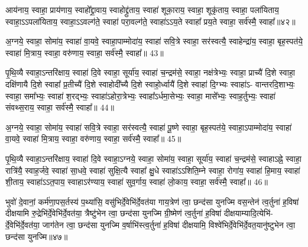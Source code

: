 {\anuvakamend[{रन्तिः॒ स्वाहा॒ द्वाविꣳ॑शतिश्च॥12॥}]}

आय॑नाय॒ स्वाहा॒ प्राय॑णाय॒ स्वाहो᳚द्द्रा॒वाय॒ स्वाहोद्द्रु॑ताय॒ स्वाहा॑ शूका॒राय॒ स्वाहा॒ शूकृ॑ताय॒ स्वाहा॒ पला॑यिताय॒ स्वाहा॒\-ऽ\-ऽपला॑यिताय॒ स्वाहा॒\-ऽ\-ऽवल्ग॑ते॒ स्वाहा॑ परा॒वल्ग॑ते॒ स्वाहा॑\-ऽ\-ऽय॒ते स्वाहा᳚ प्रय॒ते स्वाहा॒ सर्व॑स्मै॒ स्वाहा᳚॥४२॥

{\anuvakamend[{आय॑ना॒योत्त॑रमा॒पला॑यिताय॒ षड्विꣳ॑शतिः॥13॥}]}

अ॒ग्नये॒ स्वाहा॒ सोमा॑य॒ स्वाहा॑ वा॒यवे॒ स्वाहा॒पाम्मोदा॑य॒ स्वाहा॑ सवि॒त्रे स्वाहा॒ सर॑स्वत्यै॒ स्वाहेन्द्रा॑य॒ स्वाहा॒ बृह॒स्पत॑ये॒ स्वाहा॑ मि॒त्राय॒ स्वाहा॒ वरु॑णाय॒ स्वाहा॒ सर्व॑स्मै॒ स्वाहा᳚॥ 43॥

{\anuvakamend[{}]}

पृ॒थि॒व्यै स्वाहा॒\-ऽन्तरि॑क्षाय॒ स्वाहा॑ दि॒वे स्वाहा॒ सूर्या॑य॒ स्वाहा॑ च॒न्द्रम॑से॒ स्वाहा॒ नक्ष॑त्रेभ्यः॒ स्वाहा॒ प्राच्यै॑ दि॒शे स्वाहा॒ दक्षि॑णायै दि॒शे स्वाहा᳚ प्र॒तीच्यै॑ दि॒शे स्वाहोदी᳚च्यै दि॒शे स्वाहो॒र्ध्वायै॑ दि॒शे स्वाहा॑ दि॒ग्भ्यः स्वाहा॑\-ऽ- वान्तरदि॒शाभ्यः॒ स्वाहा॒ समा᳚भ्यः॒ स्वाहा॑ श॒रद्भ्यः॒ स्वाहा॑\-ऽहोरा॒त्रेभ्यः॒ स्वाहा᳚\-ऽर्धमा॒सेभ्यः॒ स्वाहा॒ मासे᳚भ्यः॒ स्वाह॒र्तुभ्यः॒ स्वाहा॑ संवथ्स॒राय॒ स्वाहा॒ सर्व॑स्मै॒ स्वाहा᳚॥ 44॥

{\anuvakamend[{}]}

अ॒ग्नये॒ स्वाहा॒ सोमा॑य॒ स्वाहा॑ सवि॒त्रे स्वाहा॒ सर॑स्वत्यै॒ स्वाहा॑ पू॒ष्णे स्वाहा॒ बृह॒स्पत॑ये॒ स्वाहा॒\-ऽपाम्मोदा॑य॒ स्वाहा॑ वा॒यवे॒ स्वाहा॑ मि॒त्राय॒ स्वाहा॒ वरु॑णाय॒ स्वाहा॒ सर्व॑स्मै॒ स्वाहा᳚॥ 45॥

{\anuvakamend[{}]}

पृ॒थि॒व्यै स्वाहा॒\-ऽन्तरि॑क्षाय॒ स्वाहा॑ दि॒वे स्वाहा॒\-ऽग्नये॒ स्वाहा॒ सोमा॑य॒ स्वाहा॒ सूर्या॑य॒ स्वाहा॑ च॒न्द्रम॑से॒ स्वाहा\-ऽह्ने॒ स्वाहा॒ रात्रि॑यै॒ स्वाह॒र्जवे॒ स्वाहा॑ सा॒धवे॒ स्वाहा॑ सुक्षि॒त्यै स्वाहा᳚ क्षु॒धे स्वाहा॑\-ऽ\-ऽशिति॒म्ने स्वाहा॒ रोगा॑य॒ स्वाहा॑ हि॒माय॒ स्वाहा॑ शी॒ताय॒ स्वाहा॑\-ऽ\-ऽत॒पाय॒ स्वाहा\-ऽर॑ण्याय॒ स्वाहा॑ सुव॒र्गाय॒ स्वाहा॑ लो॒काय॒ स्वाहा॒ सर्व॑स्मै॒ स्वाहा᳚॥ 46॥

{\anuvakamend[{}]}

भुवो॑ दे॒वानां॒ कर्म॑णा॒पस॒र्तस्य॑ प॒थ्या॑सि॒ वसु॑भिर्दे॒वेभि॑र्दे॒वत॑या गाय॒त्रेण॑ त्वा॒ छन्द॑सा युनज्मि वस॒न्तेन॑ त्व॒र्तुना॑ ह॒विषा॑ दीक्षयामि रु॒द्रेभि॑र्दे॒वेभि॑र्दे॒वत॑या॒ त्रैष्टु॑भेन त्वा॒ छन्द॑सा युनज्मि ग्री॒ष्मेण॑ त्व॒र्तुना॑ ह॒विषा॑ दीक्षयाम्यादि॒त्येभि॑- र्दे॒वेभि॑र्दे॒वत॑या॒ जाग॑तेन त्वा॒ छन्द॑सा युनज्मि व॒र्\mbox{}षाभि॑स्त्व॒र्तुना॑ ह॒विषा॑ दीक्षयामि॒ विश्वे॑भिर्दे॒वेभि॑र्दे॒वत॒यानु॑ष्टुभेन त्वा॒ छन्द॑सा युनज्मि॥४७॥

